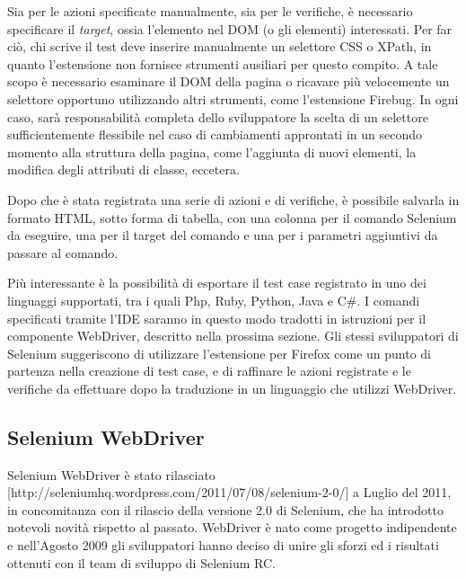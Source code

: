 \documentclass[12pt]{toptesi}
\begin{document}
Sia per le azioni specificate manualmente, sia per le verifiche, è necessario specificare il \emph{target}, ossia l'elemento nel DOM (o gli elementi) interessati. Per far ciò, chi scrive il test deve inserire manualmente un selettore CSS o XPath, in quanto l'estensione non fornisce strumenti ausiliari per questo compito. A tale scopo è necessario esaminare il DOM della pagina o ricavare più velocemente un selettore opportuno utilizzando altri strumenti, come l'estensione Firebug. In ogni caso,   sarà responsabilità completa dello sviluppatore la scelta di un selettore sufficientemente flessibile nel caso di cambiamenti approntati in un secondo momento alla struttura della pagina, come l'aggiunta di nuovi elementi, la modifica degli attributi di classe, eccetera. 

Dopo che è stata registrata una serie di azioni e di verifiche, è possibile salvarla in formato HTML, sotto forma di tabella, con una colonna per il comando Selenium da eseguire, una per il target del comando e una per i parametri aggiuntivi da passare al comando.

Più interessante è la possibilità di esportare il test case registrato in uno dei linguaggi supportati, tra i quali Php, Ruby, Python, Java e C\#. I comandi specificati tramite l'IDE saranno in questo modo tradotti in istruzioni per il componente WebDriver, descritto nella prossima sezione. Gli stessi sviluppatori di Selenium suggeriscono di utilizzare l'estensione per Firefox come un punto di partenza nella creazione di test case, e di raffinare le azioni registrate e le verifiche da effettuare dopo la traduzione in un linguaggio che utilizzi WebDriver.

\subsection{Selenium WebDriver}

Selenium WebDriver è stato rilasciato [http://seleniumhq.wordpress.com/2011/07/08/selenium-2-0/] a Luglio del 2011, in concomitanza con il rilascio della versione 2.0 di Selenium, che ha introdotto notevoli novità rispetto al passato.
WebDriver è nato come progetto indipendente e nell'Agosto 2009 gli sviluppatori hanno deciso di unire gli sforzi ed i risultati ottenuti con il team di sviluppo di Selenium RC.
\end{document}
